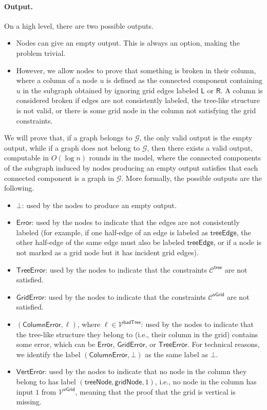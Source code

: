 \documentclass[11pt]{article}
\newcommand{\lleft}{\mathsf {L}}
\newcommand{\lright}{\mathsf {R}}
\newcommand{\lerror}{\mathsf {Error}}
\newcommand{\lgriderror}{\mathsf {GridError}}
\newcommand{\lverterror}{\mathsf {VertError}}
\newcommand{\ltreeerror}{\mathsf {TreeError}}
\newcommand{\lcolumnerror}{\mathsf {ColumnError}}
\newcommand{\lgridnode}{\mathsf {gridNode}}
\newcommand{\ltreenode}{\mathsf {treeNode}}
\newcommand{\ltreeedge}{\mathsf {treeEdge}}
\newcommand{\lvgrid}{\mathsf {vGrid}}
\newcommand{\ltreelike}{\mathsf {tree}}
\newcommand{\lbadtree}{\mathsf {badTree}}
\begin{document}
\paragraph{Output.}
On a high level, there are two possible outputs.
\begin{itemize}
	\item Nodes can give an empty output. This is always an option, making the problem trivial.
	\item However, we allow nodes to prove that something is broken in their column, where a column of a node $u$ is defined as the connected component containing $u$ in the subgraph obtained by ignoring grid edges labeled $\lleft$ or $\lright$. A column is considered broken if edges are not consistently labeled, the tree-like structure is not valid, or there is some grid node in the column not satisfying the grid constraints.
\end{itemize}
We will prove that, if a graph belongs to $\mathcal{G}$, the only valid output is the empty output, while if a graph does not belong to $\mathcal{G}$, then there exists a valid output, computable in $O(\log n)$ rounds in the \local model, where the connected components of the subgraph induced by nodes producing an empty output satisfies that each connected component is a graph in $\mathcal{G}$.
More formally, the possible outputs are the following.
\begin{itemize}
	\item $\bot$: used by the nodes to produce an empty output.
	\item $\lerror$: used by the nodes to indicate that the edges are not consistently labeled (for example, if one half-edge of an edge is labeled as $\ltreeedge$, the other half-edge of the same edge must also be labeled $\ltreeedge$, or if a node is not marked as a grid node but it has incident grid edges).
	\item $\ltreeerror$: used by the nodes to indicate that the constraints $\mathcal{C}^{\ltreelike}$ are not satisfied.
	\item $\lgriderror$: used by the nodes to indicate that the constraints $\mathcal{C}^{\lvgrid}$ are not satisfied.
	\item $(\lcolumnerror,\ell)$, where $\ell \in \mathcal{V}^{\lbadtree}$: used by the nodes to indicate that the tree-like structure they belong to (i.e., their column in the grid) contains some error, which can be $\lerror$, $\lgriderror$, or $\ltreeerror$. For technical reasons, we identify the label $(\lcolumnerror,\bot)$ as the same label as $\bot$.
	\item $\lverterror$: used by the nodes to indicate that no node in the column they belong to has label $(\ltreenode,\lgridnode,1)$, i.e., no node in the column has input $1$ from $\mathcal{V}^{\lvgrid}$, meaning that the proof that the grid is vertical is missing.
\end{itemize}
\end{document}
